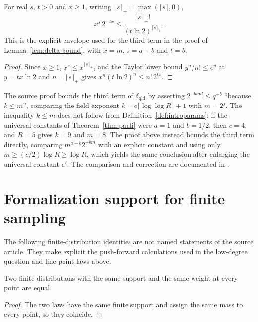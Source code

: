 \begin{lemma}
\label{lem:delta-bound-envelope-support}
\leanok
For real $s$, $t > 0$ and $x \ge 1$, writing $\lceil s \rceil_{+} = \max(\lceil s \rceil, 0)$,
\[
  x^{s}\, 2^{-t x} \le \frac{\lceil s \rceil_{+}!}{(t \ln 2)^{\lceil s \rceil_{+}}} .
\]
This is the explicit envelope used for the third term in the proof of Lemma~\ref{lem:delta-bound}, with $x = m$, $s = a + b$ and $t = b$.
\end{lemma}
\begin{proof}
\leanok
Since $x \ge 1$, $x^{s} \le x^{\lceil s \rceil_{+}}$, and the Taylor lower bound $y^{n}/n! \le e^{y}$ at $y = t x \ln 2$ and $n = \lceil s \rceil_{+}$ gives $x^{n} (t \ln 2)^{n} \le n!\, 2^{t x}$.
\end{proof}

\begin{remark}\label{rem:delta-bound-exponent-comparison}
	The source proof bounds the third term of $\delta_{\mathrm{qld}}$ by asserting $2^{-bmd} \le q^{-b}$ ``because $k \le m$'', comparing the field exponent $k = c \lceil \log\log R \rceil + 1$ with $m = 2^j$. The inequality $k \le m$ does not follow from Definition~\ref{def:introparams}: if the universal constants of Theorem~\ref{thm:pauli} were $a = 1$ and $b = 1/2$, then $c = 4$, and $R = 5$ gives $k = 9$ and $m = 8$. The proof above instead bounds the third term directly, comparing $m^{a+b} 2^{-bm}$ with an explicit constant and using only $m \ge (c/2) \log R \ge \log R$, which yields the same conclusion after enlarging the universal constant $a'$.  The comparison and correction are documented in \cite{gap:qpbt_delta-bound-exponent-comparison}.
\end{remark}

\section{Formalization support for finite sampling}

The following finite-distribution identities are not named statements of the
source article.  They make explicit the push-forward calculations used in the
low-degree question and line-point laws above.

\begin{lemma}\label{lem:distribution-ext-support}
	\leanok
	Two finite distributions with the same support and the same weight at every
	point are equal.
\end{lemma}
\begin{proof}
	\leanok
	The two laws have the same finite support and assign the same mass to every
	point, so they coincide.
\end{proof}

